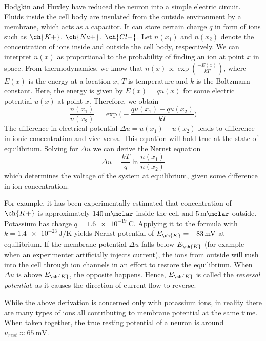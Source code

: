\documentclass[12pt]{article}
\begin{document}
Hodgkin and Huxley have reduced the neuron into a simple electric circuit. Fluids inside the cell body are insulated from the outside environment by a membrane, which acts as a capacitor. It can store certain charge $q$ in form of ions such as $\ch{K+}$, $\ch{Na+}$, $\ch{Cl-}$. Let $n(x_1)$ and $n(x_2)$ denote the concentration of ions inside and outside the cell body, respectively. We can interpret $n(x)$ as proportional to the probability of finding an ion at point $x$ in space. From thermodynamics, we know that 
$n(x)\propto \exp(\frac{-E(x)}{kT})$, 
where $E(x)$ is the energy at a location $x$, $T$ is temperature and $k$ is the Boltzmann constant. Here, the energy is given by $E(x)=q u(x)$ for some electric potential $u(x)$ at point $x$. Therefore, we obtain
\[
\frac{n(x_1)}{n(x_2)} = \exp\big(-\frac{qu(x_1)-qu(x_2)}{kT}\big)
\]
The difference in electrical potential $\Delta u = u(x_1) - u(x_2)$ leads to  difference in ionic concentration and vice versa. This equation will hold true at the state of equilibrium. Solving for $\Delta u$ we can derive the Nernst equation 
\[
\Delta u = \frac{kT}{q}\ln\frac{n(x_1)}{n(x_2)}
\]
which determines the voltage of the system at equilibrium, given some difference in ion concentration. 
 
For example, it has been experimentally estimated that concentration of $\ch{K+}$ is approximately $\SI{140}{\milli\molar}$ inside the cell  and  $\SI{5}{\milli\molar}$ outside. Potassium has charge $q=\SI{1.6e-19}{\coulomb}$. Applying it to the formula with $k=\SI{1.4e-23}{\joule/\kelvin}$ yields Nernst potential of $E_{\ch{K}}=\SI{-83}{\milli\volt}$ at equilibrium. If the membrane potential $\Delta u$ falls below $E_{\ch{K}}$ (for example when an experimenter artificially injects current), the ions from outside will rush into the cell through ion channels in an effort to restore the equilibrium. When $\Delta u$ is above $E_{\ch{K}}$, the opposite happens. Hence, $E_{\ch{K}}$ is called the \textit{reversal potential}, as it causes the direction of current flow to reverse.

While the above derivation is concerned only with potassium ions, in reality there are many types of ions all contributing to membrane potential at the same time. When taken together, the true resting potential of a neuron is around $u_{rest} \approx \SI{65}{\milli\volt}$.
\end{document}
